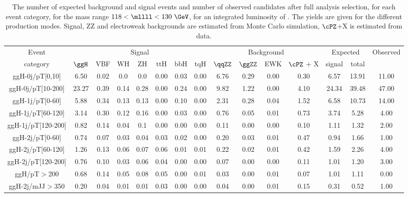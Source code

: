 \begin{table}[htb]
	\begin{center}
		\small
		\caption{The number of expected background and signal events and number of observed candidates after full analysis selection, for each event category, for the mass range $118<\mllll<130~\GeV$, for an integrated luminosity of \usedLumiA.
			The yields are given for the different production modes.
			Signal, ZZ and electroweak backgrounds are estimated from Monte Carlo simulation, 
			$\cPZ$+X is estimated from data.
			\label{tab:EventYieldsPeakCategA}}
		\resizebox{\textwidth}{!}
		{
				\begin{tabular}{cccccccc|cccc|cc|c}
				\hline
				\hline
				Event & \multicolumn{7}{c|}{Signal} & \multicolumn{4}{c|}{Background} &  \multicolumn{2}{c|}{Expected} & Observed \\
				category             & $\ggH$ &VBF    &WH    &ZH    &ttH   &bbH   &tqH   &$\qqZZ$  &$\ggZZ$  & EWK & $\cPZ$ + X & signal&total& \\
				\hline
ggH-0j/pT[0,10] & 6.50 & 0.02 & 0.0 & 0.0 & 0.00 & 0.03 & 0.00 & 6.76 & 0.29 & 0.00 & 0.30 & 6.57 & 13.91 & 11.00
\\
ggH-0j/pT[10-200] & 23.27 & 0.39 & 0.14 & 0.28 & 0.00 & 0.24 & 0.00 & 9.82 & 1.22 & 0.00 & 4.10 & 24.34 & 39.48 & 47.00
\\
ggH-1j/pT[0-60] & 5.88 & 0.34 & 0.13 & 0.13 & 0.00 & 0.10 & 0.00 & 2.31 & 0.28 & 0.04 & 1.52 & 6.58 & 10.73 & 14.00
\\
ggH-1j/pT[60-120] & 3.14 & 0.30 & 0.12 & 0.16 & 0.00 & 0.03 & 0.00 & 0.76 & 0.05 & 0.01 & 0.73 & 3.74 & 5.28 & 4.00
\\
ggH-1j/pT[120-200] & 0.82 & 0.14 & 0.04 & 0.1 & 0.00 & 0.00 & 0.00 & 0.11 & 0.00 & 0.00 & 0.10 & 1.11 & 1.32 & 2.00
\\
ggH-2j/pT[0-60] & 0.74 & 0.07 & 0.03 & 0.04 & 0.03 & 0.02 & 0.00 & 0.20 & 0.03 & 0.01 & 0.47 & 0.94 & 1.66 & 1.00
\\
ggH-2j/pT[60-120] & 1.26 & 0.13 & 0.06 & 0.07 & 0.06 & 0.01 & 0.01 & 0.22 & 0.02 & 0.01 & 0.42 & 1.59 & 2.26 & 4.00
\\
ggH-2j/pT[120-200] & 0.76 & 0.10 & 0.03 & 0.06 & 0.04 & 0.00 & 0.00 & 0.07 & 0.00 & 0.00 & 0.11 & 1.01 & 1.20 & 3.00
\\
ggH/pT$>$200 & 0.68 & 0.14 & 0.05 & 0.08 & 0.05 & 0.00 & 0.01 & 0.03 & 0.00 & 0.01 & 0.07 & 1.01 & 1.11 & 0.00
\\
ggH-2j/mJJ$>$350 & 0.20 & 0.04 & 0.01 & 0.01 & 0.03 & 0.00 & 0.00 & 0.04 & 0.00 & 0.01 & 0.15 & 0.31 & 0.52 & 1.00

\end{tabular}}
\end{center}
\end{table}
